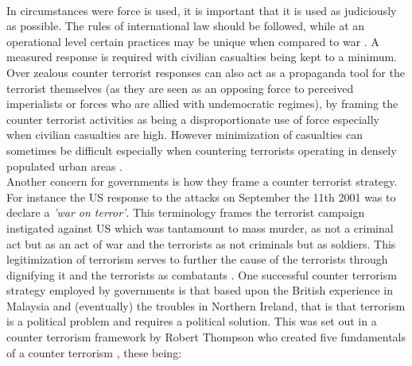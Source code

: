 \\
In circumstances were force is used, it is important that it is used as judiciously as possible. The rules of international law should be followed, while at an operational level certain practices may be unique when compared to war \citep{roberts2002counter}. A measured response is required with civilian casualties being kept to a minimum. Over zealous counter terrorist responses can also act as a propaganda tool for the terrorist themselves (as they are seen as an opposing force to perceived imperialists or forces who are allied with undemocratic regimes), by framing the counter terrorist activities as being a disproportionate use of force especially when civilian casualties are high. However minimization of casualties can sometimes be difficult especially when countering terrorists operating in densely populated urban areas \citep{graham2009urban}.  
\\
Another concern for governments is how they frame a counter terrorist strategy. For instance the US response to the attacks on September the 11th 2001 was to declare a \textit{'war on terror'}. This terminology frames the terrorist campaign instigated against US which was tantamount to mass murder, as not a criminal act but as an act of war and the terrorists as not criminals but as soldiers. This legitimization of terrorism serves to further the cause of the terrorists through dignifying it and the terrorists as combatants \citep{moeller2009packaging}. One successful counter terrorism  strategy employed by governments is that based upon the British experience in Malaysia and (eventually) the troubles in Northern Ireland, that is that terrorism is a political problem and requires a political solution. This was set out in a counter terrorism framework by Robert Thompson \citep{hamilton1998art} who created five fundamentals of a counter terrorism \citep{thompson1966defeating}, these being:
